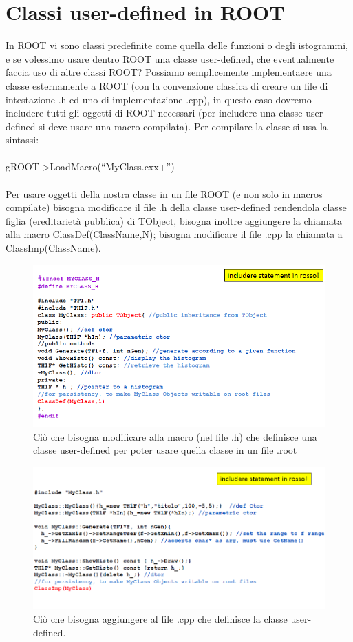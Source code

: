 \documentclass[10pt,a4paper]{article}
\begin{document}
\section{Classi user-defined in ROOT}
In ROOT vi sono classi predefinite come quella delle funzioni o degli istogrammi, e se volessimo usare dentro ROOT una classe user-defined, che eventualmente faccia uso di altre classi ROOT? Possiamo semplicemente implementaere una classe esternamente a ROOT (con la convenzione classica di creare un file di intestazione .h ed uno di implementazione .cpp), in questo caso dovremo includere tutti gli oggetti di ROOT necessari (per includere una classe user-defined si deve usare una macro compilata). Per compilare la classe si usa la sintassi:\\\\
gROOT->LoadMacro(“MyClass.cxx+”)\\\\
Per usare oggetti della nostra classe in un file ROOT (e non solo in macros compilate) bisogna modificare il file .h della classe user-defined rendendola classe figlia (ereditarietà pubblica) di TObject, bisogna inoltre aggiungere la chiamata alla macro ClassDef(ClassName,N); bisogna modificare il file .cpp la chiamata a ClassImp(ClassName).
\begin{figure}[h!]
	\centering
	\includegraphics[width=1.\linewidth]{classi-root-1}
	\caption{Ciò che bisogna modificare alla macro (nel file .h) che definisce una classe user-defined per poter usare quella classe in un file .root}
	\label{fig:classi-root-1}
\end{figure}
\FloatBarrier
\begin{figure}[h!]
	\centering
	\includegraphics[width=1.\linewidth]{classi-root-2}
	\caption{Ciò che bisogna aggiungere al file .cpp che definisce la classe user-defined.}
	\label{fig:classi-root-2}
\end{figure}
\end{document}
